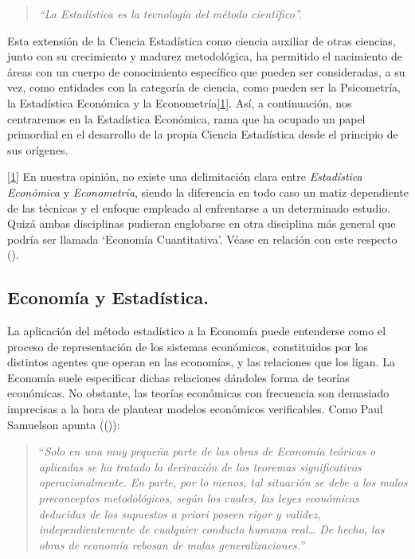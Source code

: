 \documentclass[
]{book}
\begin{document}
\begin{quote}
\emph{``La Estadística es la tecnología del método científico''.}
\end{quote}

Esta extensión de la Ciencia Estadística como ciencia auxiliar de otras ciencias, junto con su crecimiento y madurez metodológica, ha permitido el nacimiento de áreas con un cuerpo de conocimiento específico que pueden ser consideradas, a su vez, como entidades con la categoría de ciencia, como pueden ser la Psicometría, la Estadística Económica y la Econometría\hyperref[_ftn1]{{[}1{]}}. Así, a continuación, nos centraremos en la Estadística Económica, rama que ha ocupado un papel primordial en el desarrollo de la propia Ciencia Estadística desde el principio de sus orígenes.

\hyperref[_ftnref1]{{[}1{]}} En nuestra opinión, no existe una delimitación clara entre \emph{Estadística Económica} y \emph{Econometría}, siendo la diferencia en todo caso un matiz dependiente de las técnicas y el enfoque empleado al enfrentarse a un determinado estudio. Quizá ambas disciplinas pudieran englobarse en otra disciplina más general que podría ser llamada `Economía Cuantitativa'. Véase en relación con este respecto ().

\subsection{Economía y Estadística.}\label{economuxeda-y-estaduxedstica.}

La aplicación del método estadístico a la Economía puede entenderse como el proceso de representación de los sistemas económicos, constituidos por los distintos agentes que operan en las economías, y las relaciones que los ligan. La Economía suele especificar dichas relaciones dándoles forma de teorías económicas. No obstante, las teorías económicas con frecuencia son demasiado imprecisas a la hora de plantear modelos económicos verificables. Como Paul Samuelson apunta (()):

\begin{quote}
``\emph{Solo en una muy pequeña parte de las obras de Economía teóricas o aplicadas se ha tratado la derivación de los teoremas significativos operacionalmente. En parte, por lo menos, tal situación se debe a los malos preconceptos metodológicos, según los cuales, las leyes económicas deducidas de los supuestos a priori poseen rigor y validez, independientemente de cualquier conducta humana real\ldots{} De hecho, las obras de economía rebosan de malas generalizaciones.''}
\end{quote}
\end{document}

